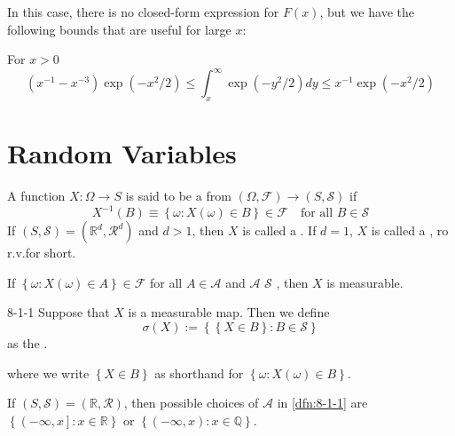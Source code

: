 \documentclass[../main.tex]{subfiles}
\begin{document}
\begin{remark}
    In this case, there is no closed-form expression for $F(x)$, but we have the following bounds that are useful for large $x$:
\end{remark}

\begin{theorem}{For $x > 0$}{}
\[
(x^{-1} - x^{-3}) \exp(-x^2/2) \leq \int_{x}^{\infty} \exp(-y^2/2)dy \leq x^{-1} \exp(-x^2/2)
\]
\end{theorem}


\section{Random Variables}

\begin{definition}{}{}
    A function \(  X: \Omega \to S  \) is said to be a  from \(  \left(\Omega ,\mathcal{F}\right)\to\left(S,\mathcal{S} \right)\) if \[
    X^{-1} \left( B \right)\equiv \left\{  \omega :X\left(  \omega  \right)\in B  \right\}\in \mathcal{F} \quad \text{for all } B\in \mathcal{S} 
    \]  If \(  \left( S,\mathcal{S} \right)= \left( \mathbb{R} ^{d},\mathcal{R}^{d} \right)    \) and \(  d> 1  \), then \(  X  \) is called a . If \(  d= 1  \), \(  X  \) is called a , ro r.v.for short.      
\end{definition}

\begin{theorem}{}{}
    If \(  \left\{  \omega :X\left(  \omega  \right)\in A  \right\} \in \mathcal{F} \) for all \(  A\in \mathcal{A}  \) and \(  \mathcal{A}  \)  \(  \mathcal{S}  \) , then \(  X  \) is measurable.      
\end{theorem}

\begin{definition}{}{8-1-1}
    Suppose that \(  X  \) is a measurable map. Then we define \[
     \sigma \left( X \right):= \left\{ \left\{ X \in B \right\}:B\in \mathcal{S} \right\} 
    \] as the  . 
\end{definition}
\begin{remark}
    where we write \( \left\{ X \in B \right\} \) as shorthand for \(  \left\{  \omega :X\left(  \omega  \right)\in B  \right\}  \).   
\end{remark}

\begin{example}{}{}
    If \(  \left( S,\mathcal{S} \right)= \left( \mathbb{R},\mathcal{R} \right)    \), then possible choices of \(  \mathcal{A}  \) in  \ref{dfn:8-1-1} are \(  \left\{ \left( -\infty,x \right] : x\in \mathbb{R} \right\}  \) or \(  \left\{ \left( -\infty,x \right):x \in \mathbb{Q}   \right\}  \).  
\end{example}
\end{document}
